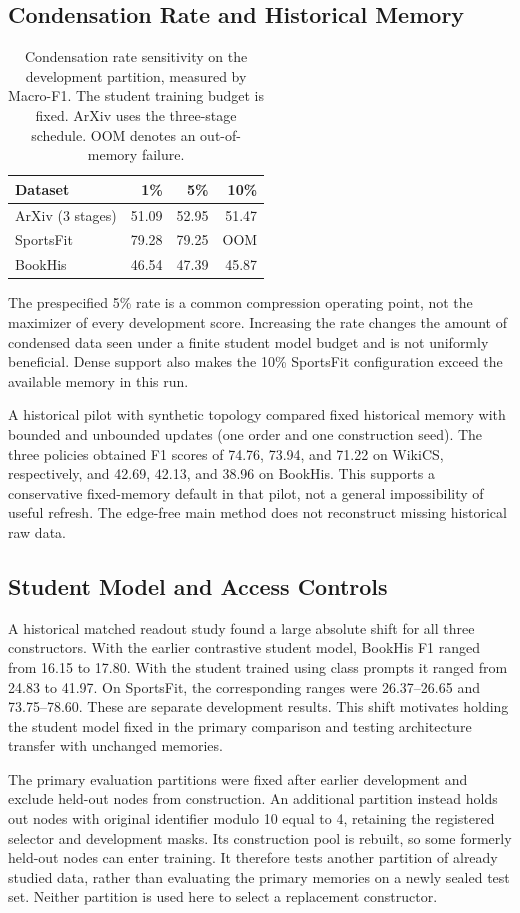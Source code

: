 \subsection{Condensation Rate and Historical Memory}

\begin{table}[H]
\centering
\footnotesize
\caption{Condensation rate sensitivity on the development partition, measured by Macro-F1. The student training budget is fixed. ArXiv uses the three-stage schedule. OOM denotes an out-of-memory failure.}
\label{tab:ratio_pilot}
\begin{tabular*}{\linewidth}{@{\extracolsep{\fill}}lrrr@{}}
\toprule
Dataset & 1\% & 5\% & 10\%\\
\midrule
ArXiv (3 stages) & 51.09 & 52.95 & 51.47\\
SportsFit & 79.28 & 79.25 & OOM\\
BookHis & 46.54 & 47.39 & 45.87\\
\bottomrule
\end{tabular*}
\end{table}

The prespecified 5\% rate is a common compression operating point, not the
maximizer of every development score. Increasing the rate changes the amount
of condensed data seen under a finite student model budget and is not uniformly
beneficial. Dense support also makes the 10\% SportsFit configuration
exceed the available memory in this run.

A historical pilot with synthetic topology compared fixed historical memory with bounded
and unbounded updates (one order and one construction seed). The three
policies obtained F1 scores of 74.76, 73.94, and 71.22 on WikiCS,
respectively, and 42.69, 42.13, and 38.96 on BookHis.
This supports a conservative fixed-memory default in that pilot, not a
general impossibility of useful refresh. The edge-free main method does not
reconstruct missing historical raw data.

\subsection{Student Model and Access Controls}

A historical matched readout study found a large absolute shift for all
three constructors. With the earlier contrastive student model, BookHis F1 ranged from 16.15
to 17.80. With the student trained using class prompts it ranged from 24.83 to 41.97. On
SportsFit, the corresponding ranges were 26.37--26.65 and 73.75--78.60.
These are separate development results. This shift motivates holding the student model fixed in
the primary comparison and testing architecture transfer with unchanged
memories.

The primary evaluation partitions were fixed after earlier development and exclude held-out nodes from construction.
An additional partition instead holds out nodes with original identifier
modulo 10 equal to 4, retaining the registered selector and development masks.
Its construction pool is rebuilt, so some formerly held-out nodes can enter training.
It therefore tests another partition of already studied data, rather than
evaluating the primary memories on a newly sealed test set. Neither partition is
used here to select a replacement constructor.
